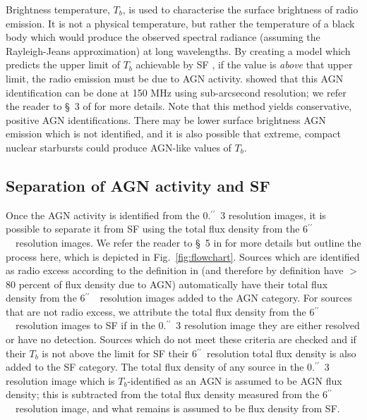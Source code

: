 \documentclass[usenatbib,fleqn,letters]{mnras}
\newcommand{\sarc}{$^{\prime\prime}\!\!$}
\begin{document}
Brightness temperature, $T_b$, is used to characterise the surface brightness of radio emission. It is not a physical temperature, but rather the temperature of a black body  which would produce the observed spectral radiance (assuming the Rayleigh-Jeans approximation) at long wavelengths. By creating a model which predicts the upper limit of $T_b$ achievable by SF \citep[based on][]{condon_radio_1992}, if the value is \textit{above} that upper limit, the radio emission must be due to AGN activity.   showed that this AGN identification can be done at 150 MHz using sub-arcsecond resolution; 
we refer the reader to \S~3 of  for more details. Note that this method yields conservative, positive AGN identifications. There may be lower surface brightness AGN emission which is not identified, and it is also possible \citep[although unlikely, according to][]{condon_radio_1992} that extreme, compact nuclear starbursts could produce AGN-like values of $T_b$. 

\subsection{Separation of AGN activity and SF}
Once the AGN activity is identified from the 0.\sarc\ 3 resolution images, it is possible to separate it from SF using the total flux density from the 6\sarc\ \ resolution images. We refer the reader to \S~5 in  for more details but outline the process here, which is depicted in Fig.~\ref{fig:flowchart}. Sources which are identified as radio excess according to the definition in  (and therefore by definition have $>$80 percent of flux density due to AGN) automatically have their total flux density from the 6\sarc\ \ resolution images added to the AGN category. For sources that are not radio excess, we attribute the total flux density from the 6\sarc\ \ resolution images to SF if in the 0.\sarc\ 3 resolution image they are either resolved or have no detection. Sources which do not meet these criteria are checked and if their $T_b$ is not above the limit for SF their 6\sarc\ resolution total flux density is also added to the SF category. The total flux density of any source in the 0.\sarc\ 3 resolution image which is $T_b$-identified as an AGN is assumed to be AGN flux density; this is subtracted from the total flux density measured from the 6\sarc\ \ resolution image, and what remains is assumed to be flux density from SF. 
\end{document}

